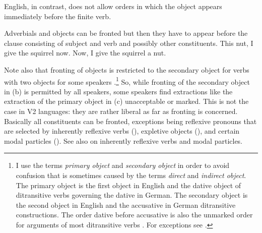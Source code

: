 English, in contrast, does not allow orders in which the object appears immediately before the
finite verb.

\eal
{}
\zl 
Adverbials and objects can be fronted but then they have to appear before the clause consisting of
subject and verb and possibly other constituents.
\eal
\ex This nut, I give the squirrel now. 
\ex Now, I give the squirrel a nut.
\zl

Note also that fronting of objects is restricted to the secondary object for verbs with two objects
for some speakers \citep[]{Hudson92a-u}.\footnote{
  I use the terms \emph{primary object} and \emph{secondary object} in order to avoid confusion that is sometimes
  caused by the terms \emph{direct} and \emph{indirect object}. The primary object is the first object in English
  and the dative object of ditransitive verbs governing the dative in German. The secondary object
  is the second object in English and the accusative in German ditransitive constructions. The order
  dative before accusative is also the unmarked order for arguments of most ditransitive verbs
  \citep{Hoehle82a}. For exceptions see .
} So, while fronting of the secondary object in
(b) is permitted by all speakers, some speakers find extractions like the extraction of the
primary object in (c) unacceptable or marked.
\vspace{-\baselineskip}
\eal
\judgewidth{\%}
\zl
This is not the case in V2 languages: they are rather liberal as far as fronting
is concerned. Basically all constituents can be fronted, exceptions being reflexive
pronouns that are selected by inherently reflexive verbs (), expletive objects (), and certain modal
particles (). See also  on inherently reflexive verbs and modal particles.
\eal
{}
